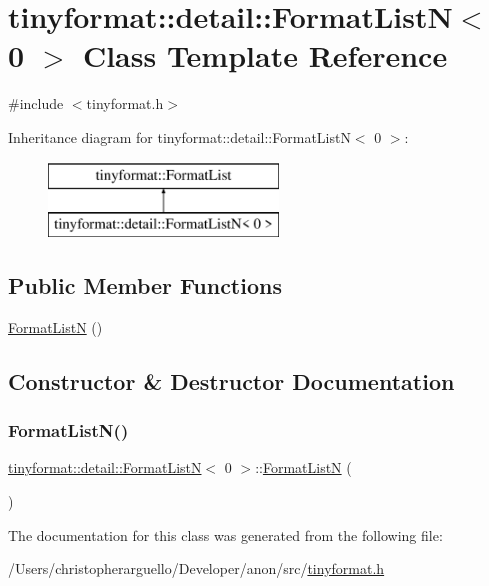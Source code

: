 \hypertarget{classtinyformat_1_1detail_1_1_format_list_n_3_010_01_4}{}\section{tinyformat\+:\+:detail\+:\+:Format\+ListN$<$ 0 $>$ Class Template Reference}
\label{classtinyformat_1_1detail_1_1_format_list_n_3_010_01_4}


{\ttfamily \#include $<$tinyformat.\+h$>$}

Inheritance diagram for tinyformat\+:\+:detail\+:\+:Format\+ListN$<$ 0 $>$\+:\begin{figure}[H]
\begin{center}
\leavevmode
\includegraphics[height=2.000000cm]{classtinyformat_1_1detail_1_1_format_list_n_3_010_01_4}
\end{center}
\end{figure}
\subsection*{Public Member Functions}
\begin{DoxyCompactItemize}
\item 
\mbox{\hyperlink{classtinyformat_1_1detail_1_1_format_list_n_3_010_01_4_a02cd16d93b54efaec0e4ef78e9842b37}{Format\+ListN}} ()
\end{DoxyCompactItemize}


\subsection{Constructor \& Destructor Documentation}
\mbox{\label{classtinyformat_1_1detail_1_1_format_list_n_3_010_01_4_a02cd16d93b54efaec0e4ef78e9842b37}} 
\subsubsection{\texorpdfstring{Format\+List\+N()}{FormatListN()}}
{\footnotesize\ttfamily \mbox{\hyperlink{classtinyformat_1_1detail_1_1_format_list_n}{tinyformat\+::detail\+::\+Format\+ListN}}$<$ 0 $>$\+::\mbox{\hyperlink{classtinyformat_1_1detail_1_1_format_list_n}{Format\+ListN}} (\begin{DoxyParamCaption}{ }\end{DoxyParamCaption})\hspace{0.3cm}{\ttfamily [inline]}}



The documentation for this class was generated from the following file\+:\begin{DoxyCompactItemize}
\item 
/\+Users/christopherarguello/\+Developer/anon/src/\mbox{\hyperlink{tinyformat_8h}{tinyformat.\+h}}\end{DoxyCompactItemize}
